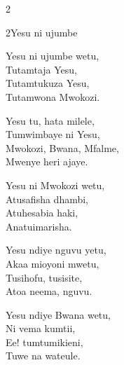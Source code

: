 \begin{multicols}{2}
\begin{hymn}{2}{Yesu ni ujumbe}{}
\begin{stanza}
Yesu ni ujumbe wetu,\\
Tutamtaja Yesu,\\
Tutamtukuza Yesu,\\
Tutamwona Mwokozi.
\end{stanza}
\begin{chorus}
Yesu tu, hata milele,\\
Tumwimbaye ni Yesu,\\
Mwokozi, Bwana, Mfalme,\\
Mwenye heri ajaye.
\end{chorus}
\begin{stanza}
Yesu ni Mwokozi wetu,\\
Atusafisha dhambi,\\
Atuhesabia haki,\\
Anatuimarisha.
\end{stanza}
\begin{stanza}
Yesu ndiye nguvu yetu,\\
Akaa mioyoni mwetu,\\
Tusihofu, tusisite,\\
Atoa neema, nguvu.
\end{stanza}
\begin{stanza}
Yesu ndiye Bwana wetu,\\
Ni vema kumtii,\\
Ee! tumtumikieni,\\
Tuwe na wateule.
\end{stanza}
\end{hymn}


\end{multicols}
